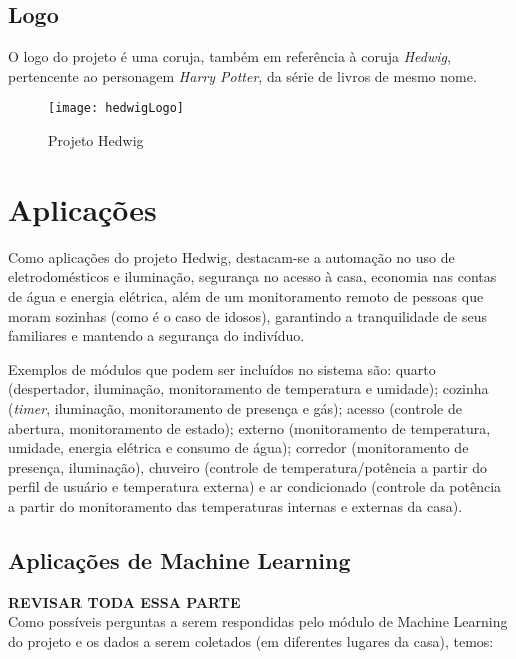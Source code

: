 \subsection{Logo}
O logo do projeto é uma coruja, também em referência à coruja \textit{Hedwig}, pertencente ao personagem \textit{Harry Potter}, da série de livros de mesmo nome.
\begin{figure}[H]
	\centering
	\caption{Projeto Hedwig}
  \texttt{[image: hedwigLogo]}
\label{fig:hedwigLogo}
\end{figure}

\section{Aplicações}
Como aplicações do projeto Hedwig, destacam-se a automação no uso de eletrodomésticos e iluminação, segurança no acesso à casa, economia nas contas de água e energia elétrica, além de um monitoramento remoto de pessoas que moram sozinhas (como é o caso de idosos), garantindo a tranquilidade de seus familiares e mantendo a segurança do indivíduo.

Exemplos de módulos que podem ser incluídos no sistema são: quarto (despertador, iluminação, monitoramento de temperatura e umidade); cozinha (\textit{timer}, iluminação, monitoramento de presença e gás); acesso (controle de abertura, monitoramento de estado); externo (monitoramento de temperatura, umidade, energia elétrica e consumo de água); corredor (monitoramento de presença, iluminação), chuveiro (controle de temperatura\slash potência a partir do perfil de usuário e temperatura externa) e ar condicionado (controle da potência a partir do monitoramento das temperaturas internas e externas da casa).

\subsection{Aplicações de Machine Learning}
\textbf{REVISAR TODA ESSA PARTE}\\
Como possíveis perguntas a serem respondidas pelo módulo de Machine Learning do projeto e os dados a serem coletados (em diferentes lugares da casa), temos:

